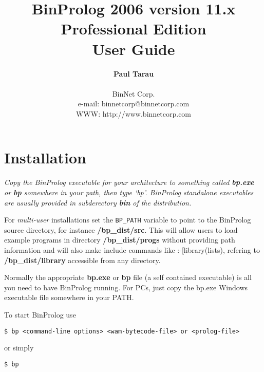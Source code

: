\documentclass{article}
\begin{document}
\pagestyle{plain}


\title{
\Huge
BinProlog 2006 version 11.x Professional Edition\\
User Guide\\
\vskip 5cm
}

\author{
\Large
  {\bf Paul Tarau}\\\\
\large
  BinNet Corp.\\
  e-mail: binnetcorp@binnetcorp.com\\
  WWW: http://www.binnetcorp.com
\normalsize
}

\date{}

\maketitle

\vskip 5cm

\newpage

\section{Installation}

{\em
Copy the BinProlog executable for your architecture to 
something called {\bf bp.exe} or {\bf bp} somewhere in your path, then type `bp'.
BinProlog standalone executables are usually provided in subderectory {\bf bin} of
the distribution.}

For {\em multi-user} installations set the {\tt BP\_PATH} variable 
to point to the BinProlog source directory, for instance {\bf /bp\_dist/src}. 
This will allow users to load
example programs in directory {\bf /bp\_dist/progs} without providing path 
information  and will also make include commands like :-[library(lists),
refering to {\bf /bp\_dist/library} accessible from any directory.

Normally the appropriate {\bf bp.exe} or {\bf bp} file (a self contained
executable) is all you need to have BinProlog  running.  For
PCs, just copy the bp.exe Windows executable file somewhere in your PATH.  

To start BinProlog use

\begin{verbatim}
$ bp <command-line options> <wam-bytecode-file> or <prolog-file>
\end{verbatim}

or simply

\begin{verbatim}
$ bp
\end{verbatim}
\end{document}
